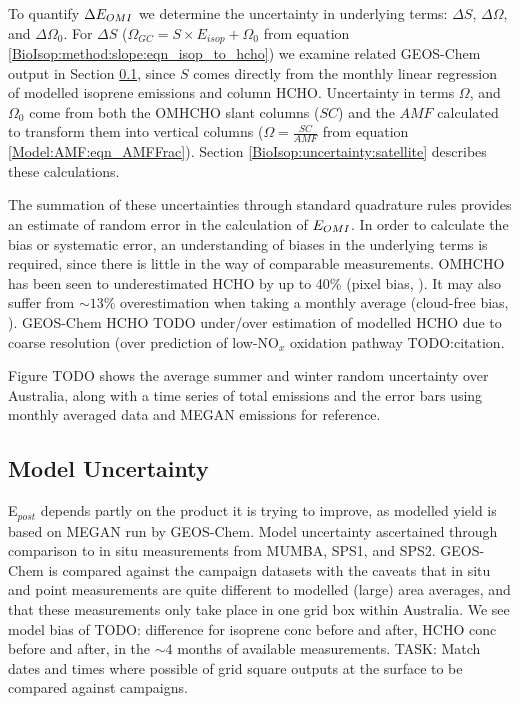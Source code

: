     To quantify $\Delta{E_{OMI}}$ we determine the uncertainty in underlying terms: $\Delta{S}$, $\Delta{\Omega}$, and $\Delta{\Omega_0}$. 
    For $\Delta{S}$ ($\Omega_{GC} = S \times E_{isop} + \Omega_0$ from equation \ref{BioIsop:method:slope:eqn_isop_to_hcho}) we examine related GEOS-Chem output in Section \ref{BioIsop:uncertainty:Model}, since $S$ comes directly from the monthly linear regression of modelled isoprene emissions and column HCHO.
    Uncertainty in terms $\Omega$, and $\Omega_0$ come from both the OMHCHO slant columns ($SC$) and the $AMF$ calculated to transform them into vertical columns ($\Omega = \frac{SC}{AMF}$ from equation \ref{Model:AMF:eqn_AMFFrac}).
    Section \ref{BioIsop:uncertainty:satellite} describes these calculations.
    
    The summation of these uncertainties through standard quadrature rules provides an estimate of random error in the calculation of $E_{OMI}$.
    In order to calculate the bias or systematic error, an understanding of biases in the underlying terms is required, since there is little in the way of comparable measurements.
    OMHCHO has been seen to underestimated HCHO by up to 40\% (pixel bias, \parencite{Zhu2016,DeSmedt2015,Barkley2013}).
    It may also suffer from $\sim13\%$ overestimation when taking a monthly average (cloud-free bias, \parencite{Surl2018}).
    GEOS-Chem HCHO TODO under/over estimation of modelled HCHO due to coarse resolution (over prediction of low-NO$_x$ oxidation pathway TODO:citation.
    
    Figure TODO shows the average summer and winter random uncertainty over Australia, along with a time series of total emissions and the error bars using monthly averaged data and MEGAN emissions for reference.
  
  \subsection{Model Uncertainty}
    \label{BioIsop:uncertainty:Model}
    
    E$_{post}$ depends partly on the product it is trying to improve, as modelled yield is based on MEGAN run by GEOS-Chem.
    Model uncertainty ascertained through comparison to in situ measurements from MUMBA, SPS1, and SPS2.
    GEOS-Chem is compared against the campaign datasets with the caveats that in situ and point measurements are quite different to modelled (large) area averages, and that these measurements only take place in one grid box within Australia.
    We see model bias of TODO: difference for isoprene conc before and after, HCHO conc before and after, in the $\sim 4$ months of available measurements.
    TASK: Match dates and times where possible of grid square outputs at the surface to be compared against campaigns.
    
